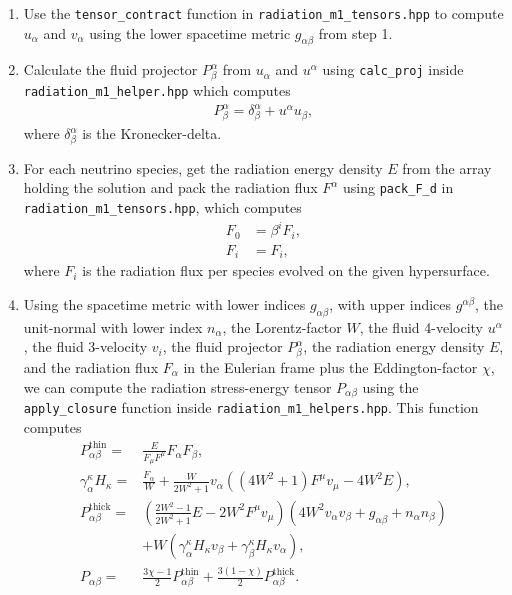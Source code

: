 \documentclass{article}
\newcommand{\var}[1]{%
  {\setlength{\fboxsep}{1.5pt}%
   \colorbox{varbg}{\textcolor{varfg}{\texttt{\small #1}}}}}
\begin{document}
\begin{enumerate}
  \item Use the \var{tensor\_contract} function in \var{radiation\_m1\_tensors.hpp} to compute $u_{\alpha}$ and
  $v_{\alpha}$ using the lower spacetime metric $g_{\alpha\beta}$ from step 1.
  \item Calculate the fluid projector $P^{\alpha}_{\beta}$ from $u_{\alpha}$ and $u^{\alpha}$ using \var{calc\_proj} inside \var{radiation\_m1\_helper.hpp} which
  computes
  \begin{align}
    P^{\alpha}_{\beta}=\delta^{\alpha}_{\beta}+u^{\alpha}u_{\beta},\nonumber
  \end{align}
  where $\delta^{\alpha}_{\beta}$ is the Kronecker-delta.
  \item For each neutrino species, get the radiation energy density $E$ from the array holding the solution and
  pack the radiation flux $F^{\alpha}$ using \var{pack\_F\_d} in \var{radiation\_m1\_tensors.hpp}, which computes
  \begin{align}
    F_{0}&=\beta^iF_i,\nonumber\\
    F_{i}&=F_i,\nonumber
  \end{align}
  where $F_{i}$ is the radiation flux per species evolved on the given hypersurface.
  \item Using the spacetime metric with lower indices $g_{\alpha\beta}$, with upper indices $g^{\alpha\beta}$,
  the unit-normal with lower index $n_{\alpha}$, the Lorentz-factor $W$, the fluid 4-velocity $u^{\alpha}$, the fluid 3-velocity
  $v_i$, the fluid projector $P^{\alpha}_{\beta}$, the radiation energy density $E$, and the radiation flux $F_{\alpha}$ in the Eulerian frame
  plus the Eddington-factor $\chi$, we can compute the radiation stress-energy tensor $P_{\alpha\beta}$ using the \var{apply\_closure}
  function inside \var{radiation\_m1\_helpers.hpp}. This function computes
  \begin{align}
    P_{\alpha\beta}^{\mathrm{thin}}=&\frac{E}{F_{\mu}F^{\mu}}F_{\alpha}F_{\beta},\nonumber\\
    \gamma^{\kappa}_{\alpha}H_{\kappa}=&\frac{F_{\alpha}}{W}+\frac{W}{2W^2+1}v_{\alpha}((4W^2+1)F^{\mu}v_{\mu}-4W^2E),\nonumber\\
    P_{\alpha\beta}^{\mathrm{thick}}=&\left(\frac{2W^2-1}{2W^2+1}E-2W^2F^{\mu}v_{\mu}\right)(4W^2v_{\alpha}v_{\beta}+g_{\alpha\beta}+n_{\alpha}n_{\beta})\nonumber\\
    &+W(\gamma^{\kappa}_{\alpha}H_{\kappa}v_{\beta}+\gamma^{\kappa}_{\beta}H_{\kappa}v_{\alpha}),\nonumber\\
    P_{\alpha\beta}=&\frac{3\chi-1}{2}P_{\alpha\beta}^{\mathrm{thin}}+\frac{3(1-\chi)}{2}P_{\alpha\beta}^{\mathrm{thick}}.\nonumber

\end{align}
\end{enumerate}
\end{document}
